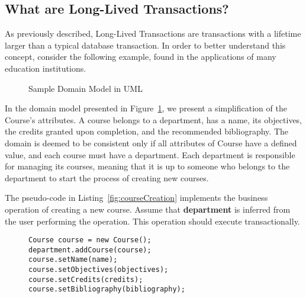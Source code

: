 \documentclass{llncs}
\begin{document}
\subsection{What are Long-Lived Transactions?}
\label{sec:what}

As previously described, Long-Lived Transactions are transactions with
a lifetime larger than a typical database transaction. In order to
better understand this concept, consider the following example, found
in the applications of many education institutions.

\begin{figure}
\centering
{}

\caption{Sample Domain Model in UML} 
\label{fig:courseDomain}

\end{figure}

In the domain model presented in Figure~\ref{fig:courseDomain}, we
present a simplification of the Course's attributes. A course belongs
to a department, has a name, its objectives, the credits granted upon
completion, and the recommended bibliography. The domain is deemed to
be consistent only if all attributes of Course have a defined value,
and each course must have a department. Each department is responsible
for managing its courses, meaning that it is up to someone who belongs
to the department to start the process of creating new courses.

The pseudo-code in Listing~\ref{fig:courseCreation} implements the
business operation of creating a new course. Assume that {\bf
  department} is inferred from the user performing the operation. This
operation should execute transactionally.

\begin{figure}

\begin{lstlisting}
Course course = new Course();
department.addCourse(course);
course.setName(name);
course.setObjectives(objectives);
course.setCredits(credits);
course.setBibliography(bibliography);
\end{lstlisting}

\end{figure}
\end{document}
